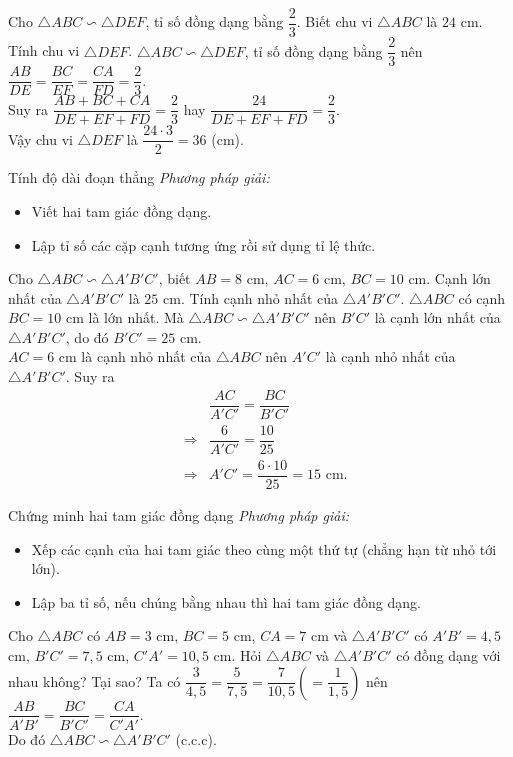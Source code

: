 \begin{vd}%
	Cho $\triangle ABC \backsim \triangle DEF$, tỉ số đồng dạng bằng $\dfrac{2}{3}$. Biết chu vi $\triangle ABC$ là $24$ cm. Tính chu vi $\triangle DEF$.
	\loigiai
	{
		$\triangle ABC \backsim \triangle DEF$, tỉ số đồng dạng bằng $\dfrac{2}{3}$ nên $\dfrac{AB}{DE} = \dfrac{BC}{EF} = \dfrac{CA}{FD} = \dfrac{2}{3}$.\\
		Suy ra $\dfrac{AB+BC+CA}{DE+EF+FD} = \dfrac{2}{3}$ hay $\dfrac{24}{DE+EF+FD} = \dfrac{2}{3}$.\\
		Vậy chu vi $\triangle DEF$ là $\dfrac{24\cdot 3}{2} = 36$ (cm).	
	}
\end{vd}

\begin{dang}{Tính độ dài đoạn thẳng}
	\emph{Phương pháp giải:}
	\begin{itemize}
		\item Viết hai tam giác đồng dạng.
		\item Lập tỉ số các cặp cạnh tương ứng rồi sử dụng tỉ lệ thức.
	\end{itemize}
\end{dang}
\begin{vd}%
	Cho $\triangle ABC \backsim \triangle A'B'C'$, biết $AB = 8$ cm, $AC = 6$ cm, $BC = 10$ cm. Cạnh lớn nhất của $\triangle A'B'C'$ là $25$ cm. Tính cạnh nhỏ nhất của $\triangle A'B'C'$.
	\loigiai 
	{
		$\triangle ABC$ có cạnh $BC = 10$ cm là lớn nhất. Mà $\triangle ABC \backsim \triangle A'B'C'$ nên $B'C'$ là cạnh lớn nhất của $\triangle A'B'C'$, do đó $B'C' = 25$ cm.\\
		$AC = 6$ cm là cạnh nhỏ nhất của $\triangle ABC$ nên $A'C'$ là cạnh nhỏ nhất của $\triangle A'B'C'$. Suy ra 
		\begin{eqnarray*}
			&&\dfrac{AC}{A'C'} = \dfrac{BC}{B'C'}\\
			&\Rightarrow& \dfrac{6}{A'C'} = \dfrac{10}{25}\\
			&\Rightarrow& A'C' = \dfrac{6 \cdot 10}{25} = 15 \text{ cm.}
		\end{eqnarray*}
	}
\end{vd}

\begin{dang}{Chứng minh hai tam giác đồng dạng}
	\emph{Phương pháp giải:} 
	\begin{itemize}
		\item Xếp các cạnh của hai tam giác theo cùng một thứ tự (chẳng hạn từ nhỏ tới lớn).
		\item Lập ba tỉ số, nếu chúng bằng nhau thì hai tam giác đồng dạng.
	\end{itemize}
\end{dang}
\begin{vd}%
	Cho $\triangle ABC$ có $AB = 3$ cm, $BC = 5$ cm, $CA = 7$ cm và $\triangle A'B'C'$ có $A'B' = 4{,}5$ cm, $B'C' = 7{,}5$ cm, $C'A' = 10{,}5$ cm. Hỏi $\triangle ABC$ và $\triangle A'B'C'$ có đồng dạng với nhau không? Tại sao?
	\loigiai
	{
		Ta có $\dfrac{3}{4{,}5} = \dfrac{5}{7{,}5} = \dfrac{7}{10{,}5} \left(=\dfrac{1}{1{,}5}\right)$ nên $\dfrac{AB}{A'B'} = \dfrac{BC}{B'C'} = \dfrac{CA}{C'A'}$.\\
		Do đó $\triangle ABC \backsim \triangle A'B'C'$ (c.c.c).
	}
\end{vd}


